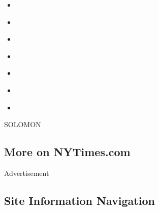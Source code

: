 \begin{itemize}
\tightlist
\item
  \href{https://www.nytimes3xbfgragh.onion/interactive/2019/10/09/magazine/tyler-perry-black-theater.html}{}
\item
  \href{https://www.nytimes3xbfgragh.onion/interactive/2019/10/09/magazine/PewDiePie-interview.html}{}
\item
  \href{https://www.nytimes3xbfgragh.onion/interactive/2019/10/09/magazine/kathryn-hahn-mrs-fletcher.html}{}
\item
  \href{https://www.nytimes3xbfgragh.onion/interactive/2019/10/08/magazine/rosalia-flamenco.html}{}
\item
  \href{https://www.nytimes3xbfgragh.onion/interactive/2019/10/08/magazine/ben-lerner-topeka-school.html}{}
\item
  \href{https://www.nytimes3xbfgragh.onion/interactive/2019/10/08/magazine/susan-sontag.html}{}
\item
  \href{https://www.nytimes3xbfgragh.onion/interactive/2019/10/09/magazine/moma-reopening.html}{}
\end{itemize}

SOLOMON

\hypertarget{more-on-nytimescom}{%
\subsection{More on NYTimes.com}\label{more-on-nytimescom}}

Advertisement

\hypertarget{site-information-navigation}{%
\subsection{Site Information
Navigation}\label{site-information-navigation}}

